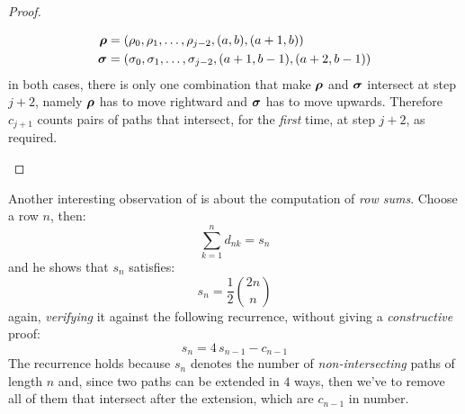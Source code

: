 \begin{proof}
\begin{itemize}
\begin{displaymath}
                \begin{split}
                    \boldsymbol{\rho}&=(\rho_{0},\rho_{1},\ldots,\rho_{j-2},(a, b),(a+1, b))\\
                    \boldsymbol{\sigma}&=(\sigma_{0},\sigma_{1},\ldots,\sigma_{j-2},(a+1,b-1),(a+2, b-1))
                \end{split}
            \end{displaymath}
            in both cases, there is only one combination that make $\boldsymbol{\rho}$ and $\boldsymbol{\sigma}$
            intersect at step $j+2$, namely $\boldsymbol{\rho}$ has to move rightward and $\boldsymbol{\sigma}$
            has to move upwards. Therefore $c_{j+1}$ counts pairs of paths that intersect,
            for the \emph{first} time, at step $j+2$, as required.
            
                 
    \end{itemize}
\end{proof}

Another interesting observation of \citeauthor{shapiro:1976} is about the computation
of \emph{row sums}. Choose a row $n$, then: 
\begin{displaymath}
    \sum_{k=1}^{n}{d_{nk}}=s_{n}
\end{displaymath}
and he shows that $s_{n}$ satisfies:
\begin{displaymath}
    s_{n}=\frac{1}{2}{{2n}\choose{n}}
\end{displaymath}
again, \emph{verifying} it against the following recurrence, without giving a \emph{constructive} proof:
\begin{displaymath}
    s_{n}=4\,s_{n-1}-c_{n-1}
\end{displaymath}
The recurrence holds because $s_{n}$ denotes the number of
\emph{non-intersecting} paths of length $n$ and, since two paths can be
extended in $4$ ways, then we've to remove all of them that intersect after the
extension, which are $c_{n-1}$ in number.
